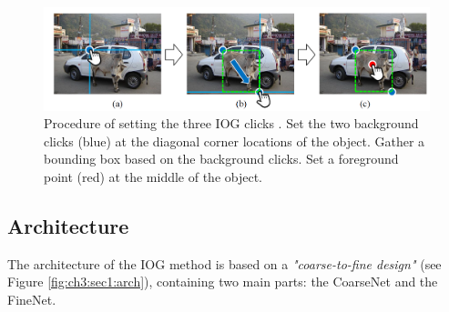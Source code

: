 \begin{figure}
	\includegraphics[width=\linewidth]{figures/chap31_clicks.png}
	\caption{Procedure of setting the three IOG clicks \cite{Zha20IOG}. Set the two background clicks (blue) at the diagonal corner locations of the object. Gather a bounding box based on the background clicks. Set a foreground point (red) at the middle of the object.}
	\label{fig:ch3:sec1:iog}
\end{figure}

\subsection{Architecture}\label{ord:ch3:sec1:subsec2}

The architecture of the IOG method is based on a \emph{"coarse-to-fine design"}\cite[p. 12237]{Zha20IOGIOG} (see Figure \ref{fig:ch3:sec1:arch}), containing two main parts: the CoarseNet and the FineNet.

